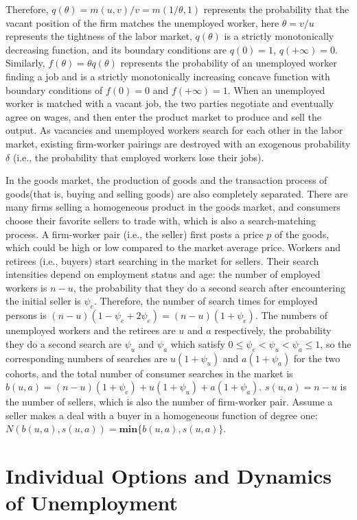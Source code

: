 \documentclass[ %
    final,
    scrbook,
    listoffigures,
    listoftables, 
    glossary]{cu-thesis}
\begin{document}
Therefore, $q(\theta)=m(u,v)/v=m(1/\theta,1)$ represents the probability that the vacant position of the firm matches the unemployed worker, here $\theta=v/u$ represents the tightness of the labor market, $q(\theta)$ is a strictly monotonically decreasing function, and its boundary conditions are $q(0)=1$, $q(+\infty)=0$. Similarly, $f(\theta)=\theta q(\theta)$ represents the probability of an unemployed worker finding a job and is a strictly monotonically increasing concave function with boundary conditions of $f(0)=0$ and $f(+\infty)=1$. When an unemployed worker is matched with a vacant job, the two parties negotiate and eventually agree on wages, and then enter the product market to produce and sell the output. As vacancies and unemployed workers search for each other in the labor market, existing firm-worker pairings are destroyed with an exogenous probability $\delta$ (i.e., the probability that employed workers lose their jobs).\par

In the goods market, the production of goods and the transaction process of goods(that is, buying and selling goods) are also completely separated. There are many firms selling a homogeneous product in the goods market, and consumers choose their favorite sellers to trade with, which is also a search-matching process. A firm-worker pair (i.e., the seller) first posts a price $p$ of the goods, which could be high or low compared to the market average price. Workers and retirees (i.e., buyers) start searching in the market for sellers. Their search intensities depend on employment status and age: the number of employed workers is $n-u$, the probability that they do a second search after encountering the initial seller is $\psi_e$. Therefore, the number of search times for employed persons is $(n-u)(1-\psi_e+2\psi_e)=(n-u)(1+\psi_e)$. The numbers of unemployed workers and the retirees are $u$ and $a$ respectively, the probability they do a second search are $\psi_u$ and $\psi_a$ which satisfy $0\leq\psi_e<\psi_u<\psi_a\leq1$, so the corresponding numbers of searches are $u(1+\psi_u)$ and $a(1+\psi_a)$ for the two cohorts, and the total number of consumer searches in the market is $b(u,a)=(n-u)(1+\psi_e)+u(1+\psi_u)+a(1+\psi_a)$. $s(u,a)=n-u$ is the number of sellers, which is also the number of firm-worker pair. Assume a seller makes a deal with a buyer in a homogeneous function of degree one: $N(b(u,a),s(u,a))=\textbf{min}\{b(u,a),s(u,a)\}$.

\section{Individual Options and Dynamics of Unemployment}
\end{document}
